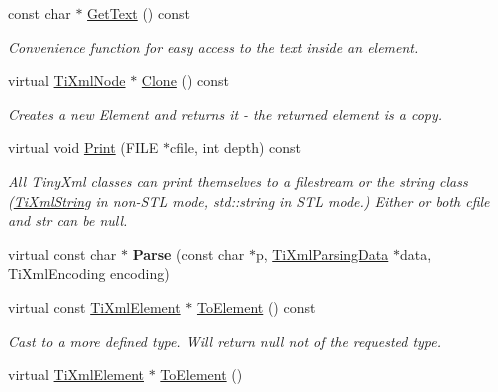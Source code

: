 \begin{DoxyCompactItemize}
\item 
const char $\ast$ \hyperlink{class_ti_xml_element_aa6dedd8a146acf3b1bc0903deb2d411a}{Get\+Text} () const 
\begin{DoxyCompactList}\small\item\em Convenience function for easy access to the text inside an element. \end{DoxyCompactList}\item 
virtual \hyperlink{class_ti_xml_node}{Ti\+Xml\+Node} $\ast$ \hyperlink{class_ti_xml_element_a13f6df105ebb1e8dc636e75cc883be32}{Clone} () const \hypertarget{class_ti_xml_element_a13f6df105ebb1e8dc636e75cc883be32}{}\label{class_ti_xml_element_a13f6df105ebb1e8dc636e75cc883be32}

\begin{DoxyCompactList}\small\item\em Creates a new Element and returns it -\/ the returned element is a copy. \end{DoxyCompactList}\item 
virtual void \hyperlink{class_ti_xml_element_ad9d0c008866982ab8d9aafae7e14d692}{Print} (F\+I\+LE $\ast$cfile, int depth) const 
\begin{DoxyCompactList}\small\item\em All Tiny\+Xml classes can print themselves to a filestream or the string class (\hyperlink{class_ti_xml_string}{Ti\+Xml\+String} in non-\/\+S\+TL mode, std\+::string in S\+TL mode.) Either or both cfile and str can be null. \end{DoxyCompactList}\item 
virtual const char $\ast$ {\bfseries Parse} (const char $\ast$p, \hyperlink{class_ti_xml_parsing_data}{Ti\+Xml\+Parsing\+Data} $\ast$data, Ti\+Xml\+Encoding encoding)\hypertarget{class_ti_xml_element_af95c9165159fd9dfdcc5b894a3fcf85b}{}\label{class_ti_xml_element_af95c9165159fd9dfdcc5b894a3fcf85b}

\item 
virtual const \hyperlink{class_ti_xml_element}{Ti\+Xml\+Element} $\ast$ \hyperlink{class_ti_xml_element_ac5b8d0e25fa23fd9acbb6d146082901c}{To\+Element} () const \hypertarget{class_ti_xml_element_ac5b8d0e25fa23fd9acbb6d146082901c}{}\label{class_ti_xml_element_ac5b8d0e25fa23fd9acbb6d146082901c}

\begin{DoxyCompactList}\small\item\em Cast to a more defined type. Will return null not of the requested type. \end{DoxyCompactList}\item 
virtual \hyperlink{class_ti_xml_element}{Ti\+Xml\+Element} $\ast$ \hyperlink{class_ti_xml_element_a9def86337ea7a755eb41cac980f60c7a}{To\+Element} ()\hypertarget{class_ti_xml_element_a9def86337ea7a755eb41cac980f60c7a}{}\label{class_ti_xml_element_a9def86337ea7a755eb41cac980f60c7a}


\end{DoxyCompactItemize}
